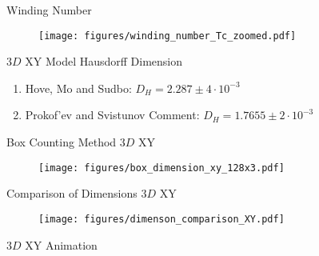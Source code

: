 \documentclass[10pt]{beamer}
\begin{document}
\begin{frame}{Winding Number}
    \begin{figure}[h!]
        \centering
            \texttt{[image: figures/winding\_number\_Tc\_zoomed.pdf]}
    \end{figure}
\end{frame}

\begin{frame}{$3D$ XY Model Hausdorff Dimension}
    \begin{enumerate}[$\bullet$]
        \item Hove, Mo and Sudbo: $D_H = 2.287 \pm 4 \cdot 10^{-3}$
        \item Prokof'ev and Svistunov Comment: $D_H = 1.7655 \pm 2 \cdot 10^{-3}$
    \end{enumerate}
\end{frame}

\begin{frame}{Box Counting Method $3D$ XY}
    \begin{figure}[h!]
        \centering
            \texttt{[image: figures/box\_dimension\_xy\_128x3.pdf]}
    \end{figure}
\end{frame}

\begin{frame}{Comparison of Dimensions $3D$ XY}
    \begin{figure}[h!]
        \centering
            \texttt{[image: figures/dimenson\_comparison\_XY.pdf]}
    \end{figure}
\end{frame}


\begin{frame}{$3D$ XY Animation}
\end{frame}
\end{document}
